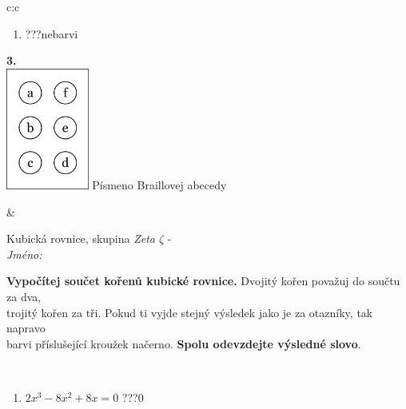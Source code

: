 \documentclass[10pt]{report}
\begin{document}
\begin{tabular}{c:c}
\begin{minipage}[c][104.5mm][t]{0.5\linewidth}
\begin{center}
\begin{minipage}{0.79\linewidth}
\begin{center}
\begin{varwidth}{\linewidth}
\begin{enumerate}
\item \quad \dotfill\; ???\;\dotfill \quad nebarvi
\end{enumerate}
\end{varwidth}
\end{center}
\end{minipage}
\begin{minipage}{0.20\linewidth}
\begin{center}
{\Huge\bfseries 3.} \\[2mm]
\includegraphics[height=40mm]{../images/braille.png}
{\small Písmeno Braillovej abecedy}
\end{center}
\end{minipage}
\end{center}
\end{minipage}
&
\begin{minipage}[c][104.5mm][t]{0.5\linewidth}
\begin{center}
\vspace{7mm}
{\huge Kubická rovnice, skupina \textit{Zeta $\zeta$} -}\\[5mm]
\textit{Jméno:}\phantom{xxxxxxxxxxxxxxxxxxxxxxxxxxxxxxxxxxxxxxxxxxxxxxxxxxxxxxxxxxxxxxxxx}\\[5mm]
\begin{minipage}{0.95\linewidth}
\begin{center}
\textbf{Vypočítej součet kořenů kubické rovnice.} Dvojitý kořen považuj do součtu za dva,\\trojitý kořen za tři. Pokud ti vyjde stejný výsledek jako je za otazníky, tak napravo\\barvi příslušející kroužek načerno. \textbf{Spolu odevzdejte výsledné slovo}.
\end{center}
\end{minipage}
\\[1mm]
\begin{minipage}{0.79\linewidth}
\begin{center}
\begin{varwidth}{\linewidth}
\begin{enumerate}
\Large
\item $2x^3-8x^2+8x=0$\quad \dotfill\; ???\;\dotfill \quad $0$

\end{enumerate}
\end{varwidth}
\end{center}
\end{minipage}
\end{center}
\end{minipage}
\end{tabular}
\end{document}
